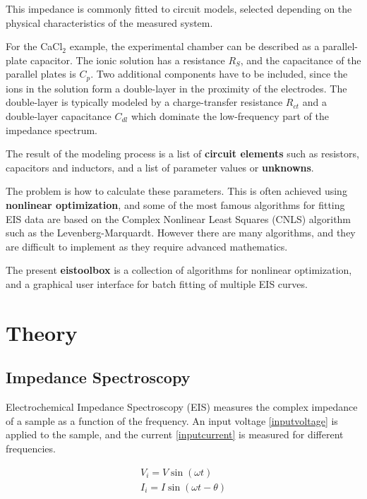 \documentclass[10pt,b5paper,oneside]{book}
\begin{document}
This impedance is commonly fitted to circuit models, selected depending on the physical characteristics of the measured system. 

For the CaCl$_2$ example, the experimental chamber can be described as a parallel-plate capacitor. The ionic solution has a resistance $R_S$, and the capacitance of the parallel plates is $C_p$. Two additional components have to be included, since the ions in the solution form a double-layer in the proximity of the electrodes. The double-layer is typically modeled by a charge-transfer resistance $R_{ct}$ and a double-layer capacitance $C_{dl}$ which dominate the low-frequency part of the impedance spectrum.

The result of the modeling process is a list of \textbf{circuit elements} such as resistors, capacitors and inductors, and a list of parameter values or \textbf{unknowns}.

The problem is how to calculate these parameters. This is often achieved using \textbf{nonlinear optimization}, and some of the most famous algorithms for fitting EIS data are based on the Complex Nonlinear Least Squares (CNLS) algorithm such as the Levenberg-Marquardt. However there are many algorithms, and they are difficult to implement as they require advanced mathematics.

The present \textbf{eistoolbox} is a collection of algorithms for nonlinear optimization, and a graphical user interface for batch fitting of multiple EIS curves.

\chapter{Theory}


\section{Impedance Spectroscopy}

Electrochemical Impedance Spectroscopy (EIS) measures the complex impedance of a sample as a function of the frequency. An input voltage \eqref{inputvoltage} is applied to the sample, and the current \eqref{inputcurrent} is measured for different frequencies.

\begin{align}
V_i = V \sin(\omega t) \label{inputvoltage} \\
I_i = I \sin(\omega t - \theta) \label{inputcurrent}
\end{align}
\end{document}
